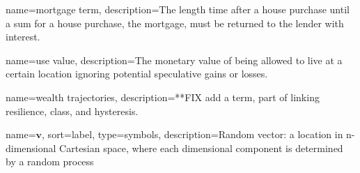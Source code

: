 {
name=mortgage term,
description={The length time after a house purchase until a sum for a house purchase, the mortgage, must be returned to the lender with interest.}
}

{
name=use value,
description={The monetary value of being allowed to live at a certain location ignoring potential speculative gains or losses.}
}

{
name=wealth trajectories,
description={**FIX add a term, part of linking resilience, class, and hysteresis.}
}








{
name={$\mathbf{v}$},
sort={label},
type=symbols,
description={Random vector: a location in n-dimensional Cartesian space, where each dimensional component is determined by a random process}
}